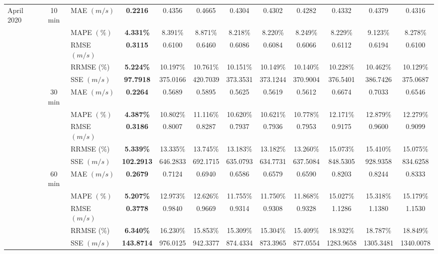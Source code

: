{\begin{longtable}[htb!]{lllccccccccc}
April 2020 & \multicolumn{1}{c}{10 min} & MAE {$(m/s)$} & \textbf{0.2216} & 0.4356 & 0.4665 & 0.4304 & 0.4302 & 0.4282 & {0.4332} & {0.4379} & {0.4316} \\
&  & MAPE {$(\%)$} & \textbf{4.331\%} & 8.391\% & 8.871\% & 8.218\% & 8.220\% & 8.249\% & {8.229\%} & {9.123\%} & {8.278\%} \\
&  & RMSE {$(m/s)$} & \textbf{0.3115} & 0.6100 & 0.6460 & 0.6086 & 0.6084 & 0.6066 & {0.6112} & {0.6194} & {0.6100} \\
&  & {RRMSE {(\%)}} & {\textbf{5.224\%}} & {10.197\%} & {10.761\%} & {10.151\%} & {10.149\%} & {10.140\%} & {10.228\%} & {10.462\%} & {10.129\%} \\
&  & {SSE {$(m/s)$}} & {\textbf{97.7918}} & {375.0166} & {420.7039} & {373.3531} & {373.1244} & {370.9004} & {376.5401} & {386.7426} & {375.0687} \\
& \multicolumn{1}{c}{30 min} & MAE {$(m/s)$} & \textbf{0.2264} & 0.5689 & 0.5895 & 0.5625 & 0.5619 & 0.5612 & {0.6674} & {0.7033} & {0.6546} \\
&  & MAPE {$(\%)$} & \textbf{4.387\%} & 10.802\% & 11.116\% & 10.620\% & 10.621\% & 10.778\% & {12.171\%} & {12.879\%} & {12.279\%} \\
&  & RMSE {$(m/s)$} & \textbf{0.3186} & 0.8007 & 0.8287 & 0.7937 & 0.7936 & 0.7953 & {0.9175} & {0.9600} & {0.9099} \\
&  & {RRMSE {(\%)}} & {\textbf{5.339\%}} & {13.335\%} & {13.745\%} & {13.183\%} & {13.182\%} & {13.260\%} & {15.073\%} & {15.410\%} & {15.075\%} \\
&  & {SSE {$(m/s)$}} & {\textbf{102.2913}} & {646.2833} & {692.1715} & {635.0793} & {634.7731} & {637.5084} & {848.5305} & {928.9358} & {834.6258} \\
& \multicolumn{1}{c}{60 min} & MAE {$(m/s)$} & \textbf{0.2679} & 0.7124 & 0.6940 & 0.6586 & 0.6579 & 0.6590 & {0.8203} & {0.8244} & {0.8333} \\
&  & MAPE {$(\%)$} & \textbf{5.207\%} & 12.973\% & 12.626\% & 11.755\% & 11.750\% & 11.868\% & {15.027\%} & {15.318\%} & {15.179\%} \\
&  & RMSE {$(m/s)$} & \textbf{0.3778} & 0.9840 & 0.9669 & 0.9314 & 0.9308 & 0.9328 & {1.1286} & {1.1380} & {1.1530} \\
&  & {RRMSE {(\%)}} & {\textbf{6.340\%}} & {16.230\%} & {15.853\%} & {15.309\%} & {15.304\%} & {15.409\%} & {18.932\%} & {18.787\%} & {18.849\%} \\
&  & {SSE {$(m/s)$}} & {\textbf{143.8714}} & {976.0125} & {942.3377} & {874.4334} & {873.3965} & {877.0554} & {1283.9658} & {1305.3481} & {1340.0078} \\ \hline

\end{longtable}}

